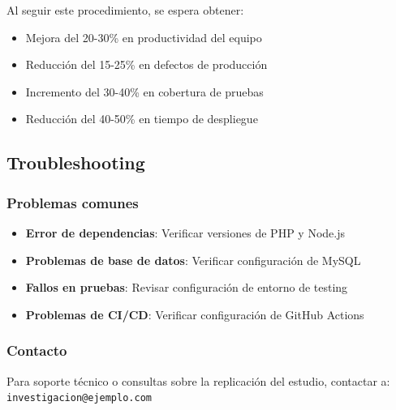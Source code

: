 Al seguir este procedimiento, se espera obtener:
\begin{itemize}[leftmargin=*]
  \item Mejora del 20-30\% en productividad del equipo
  \item Reducción del 15-25\% en defectos de producción
  \item Incremento del 30-40\% en cobertura de pruebas
  \item Reducción del 40-50\% en tiempo de despliegue
\end{itemize}

\subsection{Troubleshooting}

\subsubsection{Problemas comunes}
\begin{itemize}[leftmargin=*]
  \item \textbf{Error de dependencias}: Verificar versiones de PHP y Node.js
  \item \textbf{Problemas de base de datos}: Verificar configuración de MySQL
  \item \textbf{Fallos en pruebas}: Revisar configuración de entorno de testing
  \item \textbf{Problemas de CI/CD}: Verificar configuración de GitHub Actions
\end{itemize}

\subsubsection{Contacto}
Para soporte técnico o consultas sobre la replicación del estudio, contactar a: \texttt{investigacion@ejemplo.com}